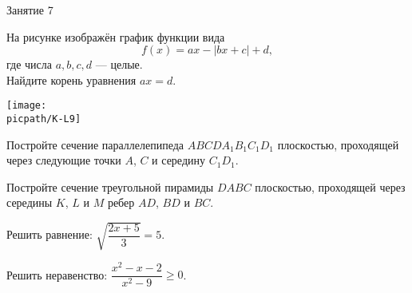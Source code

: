 \begin{class}[number=7]
	\begin{listofex}
		\item Занятие 7
	\end{listofex}
\end{class}

\begin{homework}[number=1]
	\begin{listofex}
		\item
		\begin{minipage}[t]{\bodywidth}
			На рисунке изображён график функции вида \[ f(x)=ax-|bx+c|+d, \] где числа \(a, b, c, d\) --- целые.\\ Найдите корень уравнения \(ax=d\).
		\end{minipage}
		\hspace{0.02\linewidth}
		\begin{minipage}[t]{\picwidth}
			\texttt{[image: \\picpath/K-L9]}
		\end{minipage}
		\item Постройте сечение параллелепипеда \( ABCDA_1B_1C_1D_1 \)
		плоскостью, проходящей через следующие точки \( A \), \( C \) и середину \( C_1D_1 \).
		\item Постройте сечение треугольной пирамиды \( DABC \) плоскостью,
		проходящей через середины \( K \), \( L \) и \( M \) ребер \( AD \), \( BD \) и \( BC \).
		\item Решить равнение: \( \sqrt{\dfrac{2x+5}{3}}=5 \).
		\item Решить неравенство: \( \dfrac{x^2-x-2}{x^2-9}\ge0 \).
	\end{listofex}
\end{homework}

